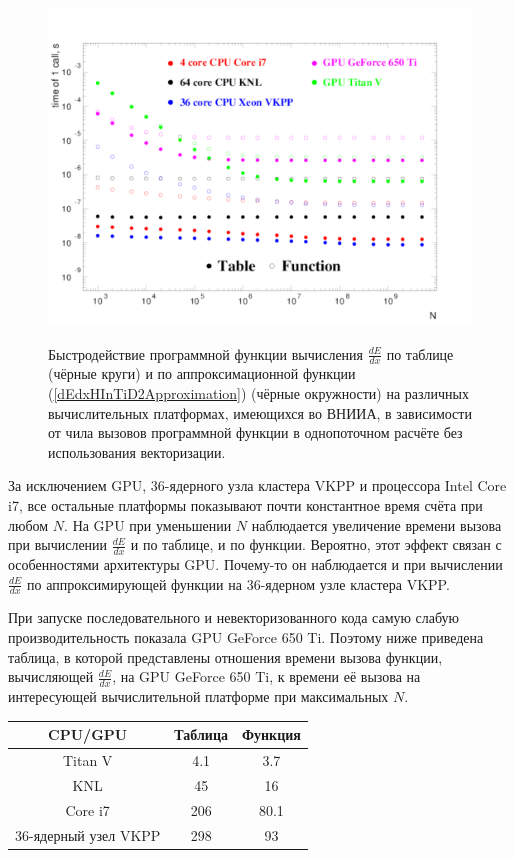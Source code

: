 \documentclass[a4paper,12pt]{article}
\begin{document}
\begin{large}
\begin{figure}[ht]
  {
     \includegraphics[width=0.99\linewidth]{images/compare_sequentially_dEdx.pdf}
  }
  \caption{Быстродействие программной функции вычисления $\frac{dE}{dx}$ по таблице (чёрные круги) и по аппроксимационной функции (\ref{dEdxHInTiD2Approximation}) (чёрные окружности) на различных вычислительных платформах, имеющихся во ВНИИА, в зависимости от чила вызовов программной функции в однопоточном расчёте без использования векторизации.}
  \label{fig:CompareSequentiallydEdx}
\end{figure}

	За исключением GPU, 36-ядерного узла кластера VKPP и процессора Intel Core i7, все остальные платформы показывают почти константное время счёта при любом $N$.
	На GPU при уменьшении $N$ наблюдается увеличение времени вызова при вычислении $\frac{dE}{dx}$ и по таблице, и по функции.
	Вероятно, этот эффект связан с особенностями архитектуры GPU. Почему-то он наблюдается и при вычислении $\frac{dE}{dx}$ по аппроксимирующей функции на 36-ядерном узле кластера VKPP. 
	
	При запуске последовательного и невекторизованного кода самую слабую производительность показала GPU GeForce 650 Ti.
	Поэтому ниже приведена таблица, в которой представлены отношения времени вызова функции, вычисляющей $\frac{dE}{dx}$, на GPU GeForce 650 Ti, к времени её вызова на интересующей вычислительной платформе при максимальных $N$.

	 \begin{tabular}{|c|c|c|}
	 \hline 
	 CPU/GPU & Таблица & Функция \\ 
	 \hline 
	 Titan V & 4.1 & 3.7 \\ 
	 \hline 
	 KNL & 45 & 16 \\ 
	 \hline 
	 Core i7 & 206 & 80.1 \\ 
	 \hline 
	 36-ядерный узел VKPP & 298 & 93 \\ 
	 \hline 
	 \end{tabular} 


\end{large}
\end{document}
